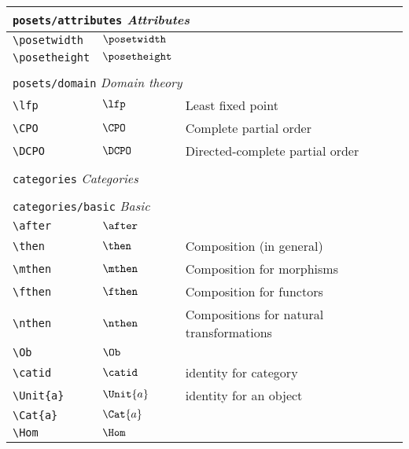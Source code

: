 \begin{longtable}{lll}
 \multicolumn{3}{l}{{\color[rgb]{0.5,0.5,0.5}\texttt{posets/attributes}} \emph{Attributes}}\\ 
 \hline
{\color[rgb]{0.5,0.5,0.5}\texttt{\textbackslash posetwidth}} & $\posetwidth$ & \\ 
 {\color[rgb]{0.5,0.5,0.5}\texttt{\textbackslash posetheight}} & $\posetheight$ & \\ 
  &  & \\ 
 \multicolumn{3}{l}{{\color[rgb]{0.5,0.5,0.5}\texttt{posets/domain}} \emph{Domain theory}}\\ 
 \hline
{\color[rgb]{0.5,0.5,0.5}\texttt{\textbackslash lfp}} & $\lfp$ &  Least fixed point\\ 
 {\color[rgb]{0.5,0.5,0.5}\texttt{\textbackslash CPO}} & $\CPO$ &  Complete partial order\\ 
 {\color[rgb]{0.5,0.5,0.5}\texttt{\textbackslash DCPO}} & $\DCPO$ &  Directed-complete partial order\\ 
  &  & \\ 
 \multicolumn{3}{l}{{\color[rgb]{0.5,0.5,0.5}\texttt{categories}} \emph{Categories}}\\ 
 \hline
\hline
 &  & \\ 
 \multicolumn{3}{l}{{\color[rgb]{0.5,0.5,0.5}\texttt{categories/basic}} \emph{Basic}}\\ 
 \hline
{\color[rgb]{0.5,0.5,0.5}\texttt{\textbackslash after}} & $\after$ & \\ 
 {\color[rgb]{0.5,0.5,0.5}\texttt{\textbackslash then}} & $\then$ &  Composition (in general)\\ 
 {\color[rgb]{0.5,0.5,0.5}\texttt{\textbackslash mthen}} & $\mthen$ &  Composition for morphisms\\ 
 {\color[rgb]{0.5,0.5,0.5}\texttt{\textbackslash fthen}} & $\fthen$ &  Composition for functors\\ 
 {\color[rgb]{0.5,0.5,0.5}\texttt{\textbackslash nthen}} & $\nthen$ &  Compositions for natural transformations\\ 
 {\color[rgb]{0.5,0.5,0.5}\texttt{\textbackslash Ob}} & $\Ob$ & \\ 
 {\color[rgb]{0.5,0.5,0.5}\texttt{\textbackslash catid}} & $\catid$ &  identity for category\\ 
 {\color[rgb]{0.5,0.5,0.5}\texttt{\textbackslash Unit\{a\}}} & $\Unit{a}$ &  identity for an object\\ 
 {\color[rgb]{0.5,0.5,0.5}\texttt{\textbackslash Cat\{a\}}} & $\Cat{a}$ & \\ 
 {\color[rgb]{0.5,0.5,0.5}\texttt{\textbackslash Hom}} & $\Hom$ & \\ 

\end{longtable}

